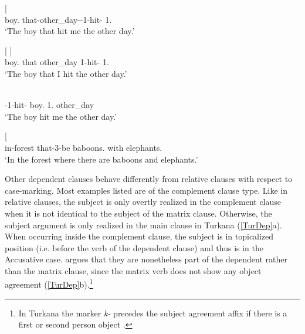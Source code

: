 \begin{exe}\ex\label{TurRel}
\begin{xlist}
\ex\gll{}  {\rm[} \textipa{a-yON\`{}}{\rm]}\\
boy.\acc{} \hspaceThis{[}that-other\_day-\transitiv{}-1\sg{}-hit-\asp{} 1\sg{}.\acc{}\\
\glt `The boy that hit me the other day.'

\ex\gll{}  {\rm[}   \textbf{}{\rm]}\\
boy.\acc{} \hspaceThis{[}that other\_day 1\sg{}-hit-\asp{} 1\sg{}.\nom{}\\
\glt `The boy that I hit the other day.'

\ex\gll{}   \\
\transitiv{}-1\sg{}-hit-\asp{} boy.\nom{} 1\sg{}.\acc{} other\_day\\
\glt `The boy hit me the other day.'

\ex\gll{}  {\rm[}    \textipa{NI-tOm-E\`{}}{\rm]}\\
in-forest \hspaceThis{[}that-3-be baboons.\nom{} with elephants.\acc{}\\
\glt `In the forest where there are baboons and elephants.'  %
\end{xlist}
\end{exe}

Other dependent clauses behave differently from relative clauses with respect to case-marking. 
Most examples listed are of the complement clause type.
Like in relative clauses, the subject is only overtly realized in the complement clause when it is not identical to the subject of the matrix clause. 
Otherwise, the subject argument is only realized in the main clause in Turkana (\ref{TurDep}a).   
When occurring inside the complement clause, the subject is in topicalized position (i.e. before the verb of the dependent clause) and thus is in the Accusative case.  
\citet[374]{Dimmendaal:1982} argues that they are nonetheless part of the dependent rather than the matrix clause, since the matrix verb does not show any object agreement (\ref{TurDep}b).\footnote{In Turkana the marker \emph{k-} precedes the subject agreement affix if there is a first or second person object \citep[122]{Dimmendaal:1982}.}  

